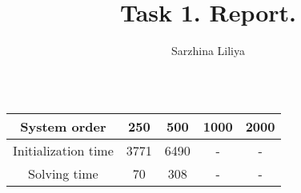 \documentclass[]{article}
\title{Task 1. Report.}
\author{Sarzhina Liliya}
\begin{document}
	
\maketitle

\section{}
	\begin{table}[h!]
	\begin{center}
		\caption {} \label{Table1} 
		\begin{footnotesize}
			\begin{tabular}{ |c|c|c|c|c| } 
				\hline
				System order & 250 & 500 & 1000 & 2000 \\
				\hline
				Initialization time & 3771 & 6490 & - & -  \\	
				\hline
				Solving time & 70 & 308 & - & - \\	
				\hline
			\end{tabular}
		\end{footnotesize}
	\end{center}
\end{table}
\end{document}
